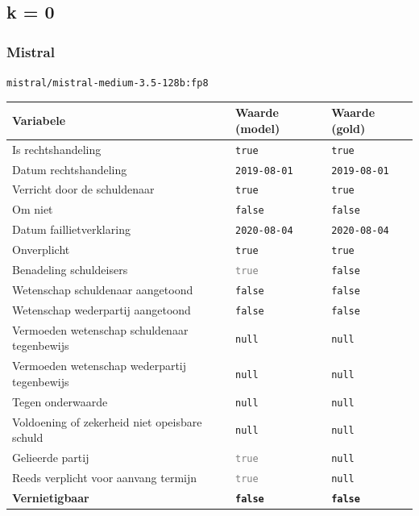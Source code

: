 \documentclass[
  dutch,
  a4paper,
]{article}
\begin{document}
\newpage


\subsection{k = 0}\label{k-0-4}

\subsubsection{Mistral}\label{mistral-12}

\texttt{mistral/mistral-medium-3.5-128b:fp8}

\begin{center}
\small
\begin{tabular}{@{}p{7.4cm}p{2.6cm}p{2.6cm}@{}}
\toprule
Variabele & Waarde (model) & Waarde (gold) \\
\midrule
Is rechtshandeling & \texttt{true} & \texttt{true} \\
Datum rechtshandeling & \texttt{2019-08-01} & \texttt{2019-08-01} \\
Verricht door de schuldenaar & \texttt{true} & \texttt{true} \\
Om niet & \texttt{false} & \texttt{false} \\
Datum faillietverklaring & \texttt{2020-08-04} & \texttt{2020-08-04} \\
Onverplicht & \texttt{true} & \texttt{true} \\
Benadeling schuldeisers & \textcolor{gray}{\texttt{true}} & \texttt{false} \\
Wetenschap schuldenaar aangetoond & \texttt{false} & \texttt{false} \\
Wetenschap wederpartij aangetoond & \texttt{false} & \texttt{false} \\
Vermoeden wetenschap schuldenaar tegenbewijs & \texttt{null} & \texttt{null} \\
Vermoeden wetenschap wederpartij tegenbewijs & \texttt{null} & \texttt{null} \\
Tegen onderwaarde & \texttt{null} & \texttt{null} \\
Voldoening of zekerheid niet opeisbare schuld & \texttt{null} & \texttt{null} \\
Gelieerde partij & \textcolor{gray}{\texttt{true}} & \texttt{null} \\
Reeds verplicht voor aanvang termijn & \textcolor{gray}{\texttt{true}} & \texttt{null} \\
\textbf{Vernietigbaar} & \textbf{\texttt{false}} & \textbf{\texttt{false}} \\
\bottomrule
\end{tabular}
\end{center}
\end{document}
